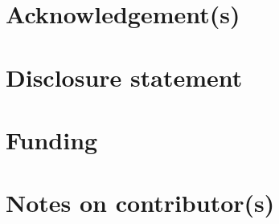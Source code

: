 \documentclass[]{interact}
\theoremstyle{plain}%
\theoremstyle{definition}
\theoremstyle{remark}
\begin{document}







\section*{Acknowledgement(s)}

\section*{Disclosure statement}

\section*{Funding}

\section*{Notes on contributor(s)}











\end{document}
